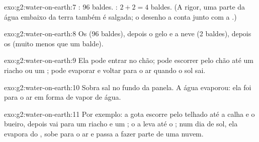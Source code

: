 \begin{solution}{exo:g2:water-on-earth:7}
: 96 baldes. : $2 + 2 = 4$ baldes.
(A rigor, uma parte da água embaixo da terra também é salgada; o desenho
a conta junto com a .)
\end{solution}

\begin{solution}{exo:g2:water-on-earth:8}
Os  (96 baldes), depois o gelo e a neve (2 baldes), depois os 
(muito menos que um balde).
\end{solution}

\begin{solution}{exo:g2:water-on-earth:9}
Ela pode entrar no chão; pode escorrer pelo chão até um riacho ou um ;
pode evaporar e voltar para o ar quando o sol sai.
\end{solution}

\begin{solution}{exo:g2:water-on-earth:10}
Sobra sal no fundo da panela. A água evaporou: ela foi para o ar em forma
de vapor de água.
\end{solution}

\begin{solution}{exo:g2:water-on-earth:11}
Por exemplo: a gota escorre pelo telhado até a calha e o bueiro, depois
vai para um riacho e um ; o  a leva até o ; num dia de sol, ela
evapora do , sobe para o ar e passa a fazer parte de uma nuvem.
\end{solution}
